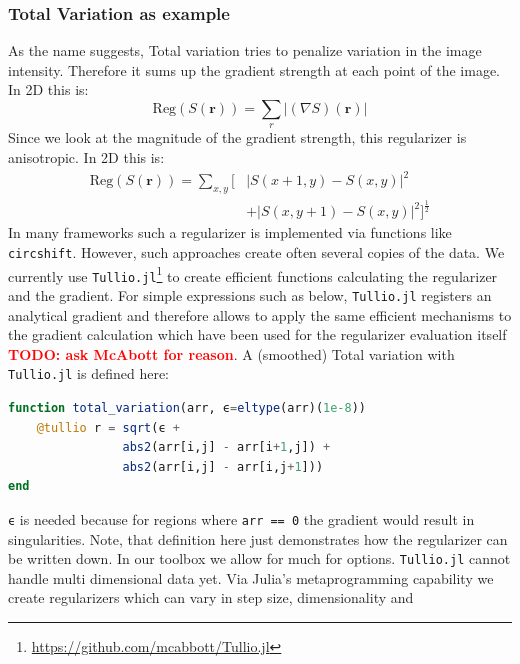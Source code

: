 \documentclass{juliacon}
\newcommand\todo[1]{\textcolor{red}{\textbf{TODO: #1}}}
\begin{document}
    \subsubsection{Total Variation as example}
        As the name suggests, Total variation tries to penalize variation in the image intensity. Therefore it sums up the gradient strength at each point
        of the image. In 2D this is:
        \begin{equation}
            \text{Reg}(S(\mathbf r)) = \sum_r  |(\nabla S)(\mathbf r)|
        \end{equation}
        Since we look at the magnitude of the gradient strength, this regularizer is anisotropic.
        In 2D this is:
        \begin{equation}
        \begin{split}
            \text{Reg}(S(\mathbf r)) = \sum_{x,y} \big[& |S(x + 1, y) - S(x, y)|^2 \\ 
                                                & + |S(x, y + 1) - S(x, y)|^2\big]^{\frac12}
        \end{split}
        \end{equation}
        In many frameworks such a regularizer is implemented via functions like \lstinline{circshift}. 
        However, such approaches create often several copies of the data. 
        We currently use \verb|Tullio.jl|\footnote{\url{https://github.com/mcabbott/Tullio.jl}} to create efficient functions 
        calculating the regularizer and the gradient. For simple expressions
        such as below, \verb|Tullio.jl| registers an analytical gradient and therefore allows to apply the same efficient mechanisms 
        to the gradient calculation which have been used for the regularizer evaluation itself \todo{ask McAbott for reason}.
        A (smoothed) Total variation with \verb|Tullio.jl| is defined here:
        \begin{lstlisting}[language = Julia]
function total_variation(arr, ϵ=eltype(arr)(1e-8))
    @tullio r = sqrt(ϵ + 
                abs2(arr[i,j] - arr[i+1,j]) +
                abs2(arr[i,j] - arr[i,j+1]))
end
        \end{lstlisting}
        \lstinline{ϵ} is needed because for regions where \lstinline{arr == 0} the gradient would result in singularities.
        Note, that definition here just demonstrates how the regularizer can be written down.
        In our toolbox we allow for much for options. \verb|Tullio.jl| cannot handle multi dimensional data yet.
        Via Julia's metaprogramming capability we create regularizers which can vary in step size, dimensionality and
\end{document}
